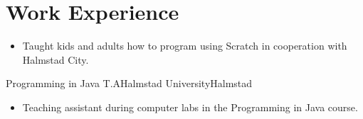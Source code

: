 \documentclass[11pt,a4paper,sans,colorlinks,linkcolor=blue,urlcolor=blue]{moderncv}
\begin{document}
\makecvtitle
\setlength{\parskip}{0.15em}
\vspace{-40.0pt}

\section{Work Experience}

{\begin{itemize}
    \itemsep0.3em
    \setlength{\itemindent}{.25in}
    \item Taught kids and adults how to program using Scratch in cooperation with Halmstad City.
\end{itemize}}

{Programming in Java T.A}{Halmstad University}{Halmstad}{}
{\begin{itemize}
    \itemsep0.3em
    \setlength{\itemindent}{.25in}
    \item Teaching assistant during computer labs in the Programming in Java course.
\end{itemize}}
\end{document}
